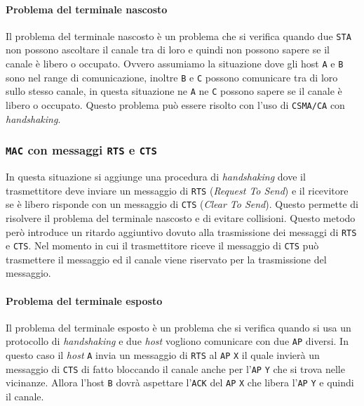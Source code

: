             \paragraph{Problema del terminale nascosto} Il problema del terminale nascosto è un problema che si verifica quando due \texttt{STA} non possono ascoltare il canale tra di loro e quindi non possono sapere se il canale è libero o occupato. Ovvero assumiamo la situazione dove gli host \texttt{A} e \texttt{B} sono nel range di comunicazione, inoltre \texttt{B} e \texttt{C} possono comunicare tra di loro sullo stesso canale, in questa situazione ne \texttt{A} ne \texttt{C} possono sapere se il canale è libero o occupato. Questo problema può essere risolto con l'uso di \texttt{CSMA/CA} con \textit{handshaking}.
        \subsubsection{\texttt{MAC} con messaggi \texttt{RTS} e \texttt{CTS}}
            In questa situazione si aggiunge una procedura di \textit{handshaking} dove il trasmettitore deve inviare un messaggio di \texttt{RTS} (\textit{Request To Send}) e il ricevitore se è libero risponde con un messaggio di \texttt{CTS} (\textit{Clear To Send}). Questo permette di risolvere il problema del terminale nascosto e di evitare collisioni. Questo metodo però introduce un ritardo aggiuntivo dovuto alla trasmissione dei messaggi di \texttt{RTS} e \texttt{CTS}. Nel momento in cui il trasmettitore riceve il messaggio di \texttt{CTS} può trasmettere il messaggio ed il canale viene riservato per la trasmissione del messaggio.
            \paragraph{Problema del terminale esposto} Il problema del terminale esposto è un problema che si verifica quando si usa un protocollo di \textit{handshaking} e due \textit{host} vogliono comunicare con due \texttt{AP} diversi. In questo caso il \textit{host} \texttt{A} invia un messaggio di \texttt{RTS} al \texttt{AP} \texttt{X} il quale invierà un messaggio di \texttt{CTS} di fatto bloccando il canale anche per l'\texttt{AP} \texttt{Y} che si trova nelle vicinanze. Allora l'host \texttt{B} dovrà aspettare l'\texttt{ACK} del \texttt{AP} \texttt{X} che libera l'\texttt{AP} \texttt{Y} e quindi il canale.
